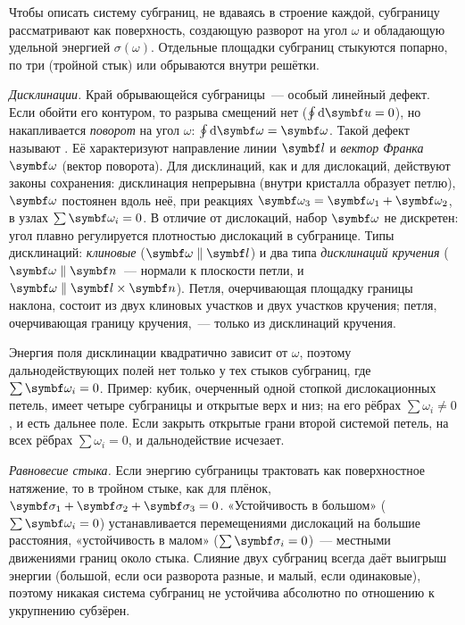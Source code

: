 \begin{podrobnee}
Чтобы описать систему субграниц, не вдаваясь в строение каждой,
субграницу рассматривают как поверхность, создающую разворот на угол
$\omega$ и обладающую удельной энергией $\sigma(\omega)$. Отдельные
площадки субграниц стыкуются попарно, по три (тройной стык) или
обрываются внутри решётки.

\emph{Дисклинации.} Край обрывающейся субграницы~— особый линейный
дефект. Если обойти его контуром, то разрыва смещений нет ($\oint\d\vb
u=0$), но накапливается \emph{поворот} на угол $\omega$:
$\oint\d\vb\omega=\vb\omega$. Такой дефект называют .
Её характеризуют направление линии $\vb l$ и \emph{вектор Франка}
$\vb\omega$ (вектор поворота). Для дисклинаций, как и для дислокаций,
действуют законы сохранения: дисклинация непрерывна (внутри кристалла
образует петлю), $\vb\omega$ постоянен вдоль неё, при реакциях
$\vb\omega_3=\vb\omega_1+\vb\omega_2$, в узлах $\sum\vb\omega_i=0$. В
отличие от дислокаций, набор $\vb\omega$ не дискретен: угол плавно
регулируется плотностью дислокаций в субгранице. Типы дисклинаций:
\emph{клиновые} ($\vb\omega\parallel\vb l$) и два типа \emph{дисклинаций
кручения} ($\vb\omega\parallel\vb n$~— нормали к плоскости петли, и
$\vb\omega\parallel\vb l\times\vb n$). Петля, очерчивающая площадку
границы наклона, состоит из двух клиновых участков и двух участков
кручения; петля, очерчивающая границу кручения,~— только из дисклинаций
кручения.

Энергия поля дисклинации квадратично зависит от $\omega$, поэтому
дальнодействующих полей нет только у тех стыков субграниц, где
$\sum\vb\omega_i=0$. Пример: кубик, очерченный одной стопкой
дислокационных петель, имеет четыре субграницы и открытые верх и низ; на
его рёбрах $\sum\omega_i\neq0$, и есть дальнее поле. Если закрыть
открытые грани второй системой петель, на всех рёбрах $\sum\omega_i=0$,
и дальнодействие исчезает.

\emph{Равновесие стыка.} Если энергию субграницы трактовать как
поверхностное натяжение, то в тройном стыке, как для плёнок,
$\vb\sigma_1+\vb\sigma_2+\vb\sigma_3=0$. «Устойчивость в большом»
($\sum\vb\omega_i=0$) устанавливается перемещениями дислокаций на
большие расстояния, «устойчивость в малом» ($\sum\vb\sigma_i=0$)~—
местными движениями границ около стыка. Слияние двух субграниц всегда
даёт выигрыш энергии (большой, если оси разворота разные, и малый, если
одинаковые), поэтому никакая система субграниц не устойчива абсолютно
по отношению к укрупнению субзёрен.
\end{podrobnee}

